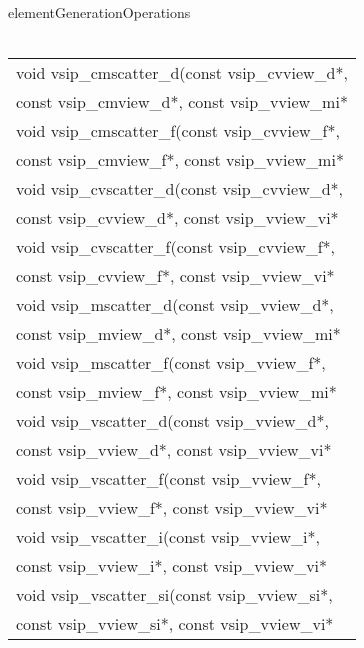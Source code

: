  {elementGenerationOperations}
\\\cvsiplh
\afh
\\\hspace*{.04\textwidth} {
\ttfamily
\begin{tabular}[H]{l}
void vsip\_cmscatter\_d(const vsip\_cvview\_d*,\\*\hspace{.7cm}const vsip\_cmview\_d*, const vsip\_vview\_mi*\\
void vsip\_cmscatter\_f(const vsip\_cvview\_f*,\\*\hspace{.7cm}const vsip\_cmview\_f*, const vsip\_vview\_mi*\\
void vsip\_cvscatter\_d(const vsip\_cvview\_d*,\\*\hspace{.7cm}const vsip\_cvview\_d*, const vsip\_vview\_vi*\\
void vsip\_cvscatter\_f(const vsip\_cvview\_f*,\\*\hspace{.7cm}const vsip\_cvview\_f*, const vsip\_vview\_vi*\\
void vsip\_mscatter\_d(const vsip\_vview\_d*,\\*\hspace{.7cm}const vsip\_mview\_d*, const vsip\_vview\_mi*\\
void vsip\_mscatter\_f(const vsip\_vview\_f*,\\*\hspace{.7cm}const vsip\_mview\_f*, const vsip\_vview\_mi*\\
void vsip\_vscatter\_d(const vsip\_vview\_d*,\\*\hspace{.7cm}const vsip\_vview\_d*, const vsip\_vview\_vi*\\
void vsip\_vscatter\_f(const vsip\_vview\_f*,\\*\hspace{.7cm}const vsip\_vview\_f*, const vsip\_vview\_vi*\\
void vsip\_vscatter\_i(const vsip\_vview\_i*,\\*\hspace{.7cm}const vsip\_vview\_i*, const vsip\_vview\_vi*\\
void vsip\_vscatter\_si(const vsip\_vview\_si*,\\*\hspace{.7cm}const vsip\_vview\_si*, const vsip\_vview\_vi*\\

\end{tabular}}

